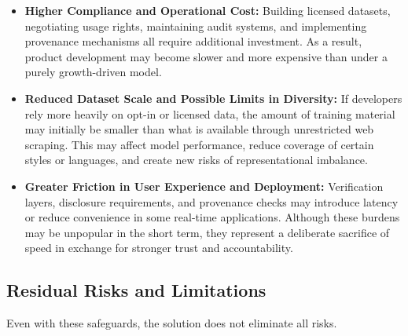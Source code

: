 \begin{itemize}
    \item \textbf{Higher Compliance and Operational Cost:} Building licensed datasets, negotiating usage rights, maintaining audit systems, and implementing provenance mechanisms all require additional investment. As a result, product development may become slower and more expensive than under a purely growth-driven model.

    \item \textbf{Reduced Dataset Scale and Possible Limits in Diversity:} If developers rely more heavily on opt-in or licensed data, the amount of training material may initially be smaller than what is available through unrestricted web scraping. This may affect model performance, reduce coverage of certain styles or languages, and create new risks of representational imbalance.

    \item \textbf{Greater Friction in User Experience and Deployment:} Verification layers, disclosure requirements, and provenance checks may introduce latency or reduce convenience in some real-time applications. Although these burdens may be unpopular in the short term, they represent a deliberate sacrifice of speed in exchange for stronger trust and accountability.
\end{itemize}

\subsection{Residual Risks and Limitations}
Even with these safeguards, the solution does not eliminate all risks.

